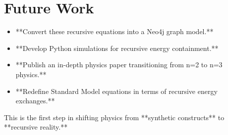 \documentclass{article}
\begin{document}
\section{Future Work}
\begin{itemize}
    \item **Convert these recursive equations into a Neo4j graph model.**
    \item **Develop Python simulations for recursive energy containment.**
    \item **Publish an in-depth physics paper transitioning from n=2 to n=3 physics.**
    \item **Redefine Standard Model equations in terms of recursive energy exchanges.**
\end{itemize}
This is the first step in shifting physics from **synthetic constructs** to **recursive reality.**
\end{document}
